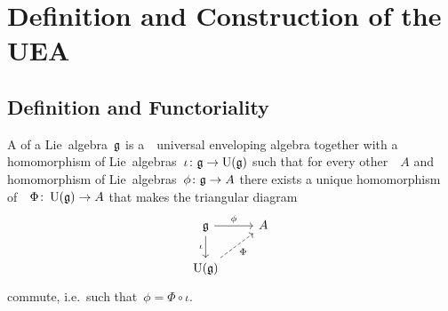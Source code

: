\section{Definition and Construction of the UEA}









\subsection{Definition and Functoriality}


\begin{definition}
  A  of a Lie~algebra~$\mathfrak{g}$ is a~\algebra{$\kf$}~\gls*{universal enveloping algebra} together with a homomorphism of Lie~algebras~$\iota \colon \mathfrak{g} \to \operatorname{U}(\mathfrak{g})$ such that for every other~{\algebra{$\kf$}}~$A$ and homomorphism of Lie~algebras~$\phi \colon \mathfrak{g} \to A$ there exists a unique homomorphism of~\algebras{$\kf$}~$\Phi \colon \operatorname{U}(\mathfrak{g}) \to A$ that makes the triangular diagram
  \[
    \begin{tikzcd}
      \glie
      \arrow{r}[above]{\phi}
      \arrow{d}[left]{\iota}
      &
      A
      \\
      \Univ(\glie)
      \arrow[dashed]{ur}[below right]{\Phi}
      &
      {}
    \end{tikzcd}
  \]
  commute, i.e.\ such that~$\phi = \Phi \circ \iota$.
\end{definition}



